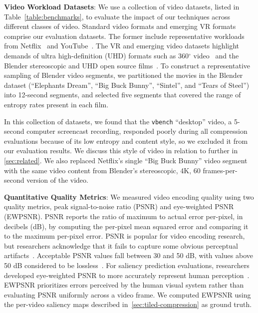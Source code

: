 \noindent \textbf{Video Workload Datasets}: We use a collection of video datasets, listed in Table~\ref{table:benchmarks}, to evaluate the impact of our techniques across different classes of video.
Standard video formats and emerging VR formats comprise our evaluation datasets.
The former include representative workloads from Netflix~\cite{netflix2016data} and YouTube~\cite{vbench}.
The VR and emerging video datasets highlight demands of ultra high-definition (UHD) formats such as 360$^\circ$ video~\cite{saliency-map} and the Blender stereoscopic and UHD open source films~\cite{blender}.
To construct a representative sampling of Blender video segments, we partitioned the movies in the Blender dataset (``Elephants Dream'', ``Big Buck Bunny'', ``Sintel'', and ``Tears of Steel'') into 12-second segments, and selected five segments that covered the range of entropy rates present in each film.

\benchmarkInformationFigure

In this collection of datasets, we found that the \texttt{vbench} ``desktop'' video, a 5-second computer screencast recording, responded poorly during all compression evaluations because of its low entropy and content style, so we excluded it from our evaluation results.
We discuss this style of video in relation to \name further in \ref{sec:related}.
We also replaced Netflix's single ``Big Buck Bunny'' video segment with the same video content from Blender's stereoscopic, 4K, 60 frames-per-second version of the video.

\noindent \textbf{Quantitative Quality Metrics}:
We measured video encoding quality using two quality metrics, peak signal-to-noise ratio (PSNR) and eye-weighted PSNR (EWPSNR).
PSNR reports the ratio of maximum to actual error per-pixel, in decibels (dB), by computing the per-pixel mean squared error and comparing it to the maximum per-pixel error.
PSNR is popular for video encoding research, but researchers acknowledge that it fails to capture some obvious perceptual artifacts~\cite{netflix2016data}.
Acceptable PSNR values fall between 30 and 50 dB, with values above 50 dB considered to be lossless~\cite{vbench}.
For saliency prediction evaluations, researchers developed eye-weighted PSNR to more accurately represent human perception~\cite{li2011visual}.
EWPSNR prioritizes errors perceived by the human visual system rather than evaluating PSNR uniformly across a video frame.
We computed EWPSNR using the per-video saliency maps described in~\ref{sec:tiled-compression} as ground truth.

